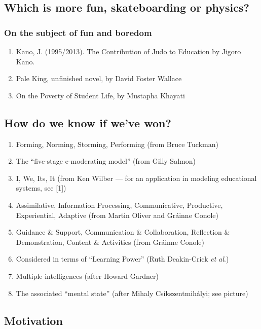 \subsection{Which is more fun, skateboarding or physics?}

\subsubsection{On the subject of fun and boredom}

\begin{enumerate}
\item
  Kano, J. (1995/2013).   \href{http://judoinfo.com/kano.htm}{The Contribution of Judo to Education} by Jigoro Kano.
\item
  Pale King, unfinished novel, by David Foster Wallace
\item
  On the Poverty of Student Life, by Mustapha Khayati
\end{enumerate}
\subsection{How do we know if we've won?}

\begin{enumerate}
\item
  Forming, Norming, Storming, Performing (from Bruce Tuckman)
\item
  The ``five-stage e-moderating model'' (from Gilly Salmon)
\item
  I, We, Its, It (from Ken Wilber --- for an application in modeling
  educational systems, see {[}1{]})
\item
  Assimilative, Information Processing, Communicative, Productive,
  Experiential, Adaptive (from Martin Oliver and Gráinne Conole)
\item
  Guidance \& Support, Communication \& Collaboration, Reflection \&
  Demonstration, Content \& Activities (from Gráinne Conole)
\item
  Considered in terms of ``Learning Power'' (Ruth Deakin-Crick \emph{et
  al}.)
\item
  Multiple intelligences (after Howard Gardner)
\item
  The associated ``mental state'' (after Mihaly Csíkszentmihályi; see
  picture)
\end{enumerate}
\subsection{Motivation}

